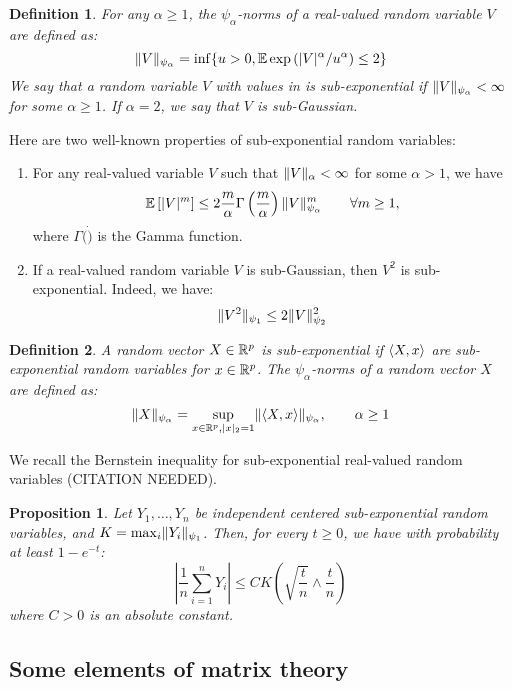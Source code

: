 \documentclass{article}
\newtheorem{definition}{Definition}
\newtheorem{proposition}{Proposition}
\numberwithin{equation}{section}
\begin{document}
    \begin{definition}
    For any $\alpha \geq 1$, the $\psi_\alpha$-norms of a real-valued random variable $V$ are defined as:
    $$ \lVert V \rVert_{\psi_{\alpha}} = \inf \lbrace u> 0, \mathbb{E}\exp\left(\vert V \vert^\alpha / u^\alpha \right) \leq 2 \rbrace $$
    We say that a random variable $V$ with values in \real is sub-exponential if $\lVert V \rVert_{\psi_{\alpha}} < \infty$ for some $\alpha \geq 1$. If $\alpha = 2$, we say that $V$ is sub-Gaussian.
    \end{definition}
    
    Here are two well-known properties of sub-exponential random variables:
    \begin{enumerate}
        \item For any real-valued variable $V$ such that $\lVert V \rVert_\alpha < \infty$ for some $\alpha > 1$, we have \[\mathbb{E}\left[ \vert V\vert^m\right] \leq 2 \frac{m}{\alpha}\Gamma\left( \frac{m}{\alpha}\right) \lVert V \rVert_{\psi_{\alpha}}^m \qquad \forall m \geq 1,\]
        where $\Gamma( \dot )$ is the Gamma function.
        \item If a real-valued random variable $V$ is sub-Gaussian, then $V^2$ is sub-exponential. Indeed, we have: \[\lVert V^2 \rVert_{\psi_{1}} \leq 2 \lVert V \rVert_{\psi_{2}}^2\]
    \end{enumerate}
    
    \begin{definition}
    A random vector $X \in \mathbb{R}^p$ is sub-exponential if $\langle X , x \rangle$ are sub-exponential random variables for $x\in \mathbb{R}^p$. The $\psi_\alpha$-norms of a random vector $X$ are defined as:
    \[\lVert X \rVert_{\psi_{\alpha}} = \sup_{x\in\mathbb{R}^p, \vert x \vert_2 = 1} \lVert \langle X , x \rangle \rVert_{\psi_{\alpha}}, \qquad \alpha \geq 1\]
    \end{definition}
    We recall the Bernstein inequality for sub-exponential real-valued random
    variables (CITATION NEEDED).
    
    \begin{proposition}
    Let $Y_1, \dots, Y_n$ be independent centered sub-exponential random 
    variables, and $K=\max_i \lVert Y_i \rVert_{\psi_{1}}$. Then, for every $t \geq 0$, we have with probability at least $1-e^{-t}$:
    \[\left\vert \frac{1}{n} \sum_{i=1}^n Y_i \right\vert \leq C K 
    \left( \sqrt{\frac{t}{n}} \wedge \frac{t}{n} \right) \]
    where $C > 0$ is an absolute constant.
    \end{proposition}
    
    \subsection{Some elements of matrix theory}
\end{document}
